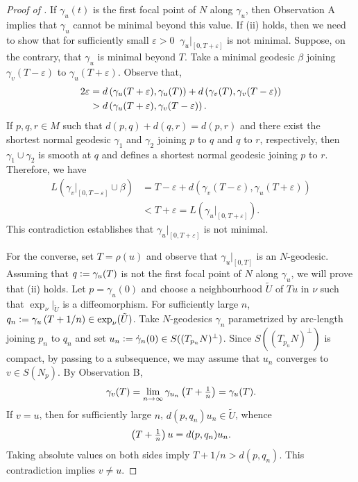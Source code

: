 \begin{proof}[Proof of ]
    If $\gamma_u(t)$ is the first focal point of $N$ along $\gamma_u$, then Observation A implies that $\gamma_u$ cannot be minimal beyond this value. If (ii) holds, then we need to show that for sufficiently small $\varepsilon>0~$ $\gamma_u|_{[0,T+\varepsilon]}$ is not minimal. Suppose, on the contrary, that $\gamma_u$ is minimal beyond $T$. Take a minimal geodesic $\beta$ joining $\gamma_{v}(T-\varepsilon)$ to $\gamma_{u}(T+\varepsilon)$. Observe that,
	\begin{align*}
	    2\varepsilon & = d\left( \gamma_{u}(T+\varepsilon),\gamma_u(T) \right) + d\left( \gamma_v(T),\gamma_v(T-\varepsilon) \right) \\
        & > d\left( \gamma_u(T+\varepsilon),\gamma_v(T-\varepsilon) \right).
	\end{align*}
    If $p,q,r\in M$ such that $d(p,q)+d(q,r) = d(p,r)$ and there exist the shortest normal geodesic $\gamma_{1}$ and $\gamma_{2}$ joining $p$ to $q$ and $q$ to $r$, respectively, then $\gamma_{1}\cup \gamma_2$ is smooth at $q$ and defines a shortest normal geodesic joining $p$ to $r$. Therefore, we have
    \begin{align*}
		L(\gamma_v|_{[0,T-\varepsilon]}\cup \beta) & = T-\varepsilon + d(\gamma_v(T-\varepsilon),\gamma_u(T+\varepsilon)) \\
        & < T + \varepsilon = L(\gamma_u|_{[0,T+\varepsilon]}).
	\end{align*}
    This contradiction establishes that $\gamma_u|_{[0,T+\varepsilon]}$ is not minimal.
    
    \vspace{0.1cm}
    \hf For the converse, set $T=\rho(u)$ and observe that $\gamma_u|_{[0,T]}$ is an $N$-geodesic. Assuming that $q\vcentcolon= \gamma_{u}(T)$ is not the first focal point of $N$ along $\gamma_{u}$, we will prove that (ii) holds. Let $p=\gamma_u(0)$ and choose a neighbourhood $\tilde{U}$ of $Tu$ in $\nu$ such that $\exp_{\nu}|_{\tilde{U}}$ is a diffeomorphism. For sufficiently large $n$, $q_{n}\vcentcolon= \gamma_{u}\left( T+1/n \right)\in \exp_{\nu}(\tilde{U})$. Take $N$-geodesics $\gamma_{n}$ parametrized by arc-length joining $p_n$ to $q_{n}$ and set $u_{n}\vcentcolon= \dot{\gamma}_{n}(0)\in S((T_{p_n}N)^\perp)$. Since $S((T_{p_n}N)^\perp)$ is compact, by passing to a subsequence, we may assume that $u_{n}$ converges to $v\in S(N_{p})$. By Observation B, 
	\begin{displaymath}
	    \gamma_v(T) = \lim_{n\to \infty} \gamma_{u_n}\left( T+\textstyle{\frac{1}{n}} \right) = \gamma_u(T).
	\end{displaymath}
    If $v = u$, then for sufficiently large $n$, $d(p,q_n)u_{n} \in \tilde{U}$, whence 
	\begin{displaymath}
	    \left( T+\textstyle{\frac{1}{n}} \right)u = d(p,q_n)u_n.
	\end{displaymath}
    Taking absolute values on both sides imply $T+1/n>d(p,q_n)$. This contradiction implies $v\neq u$.
\end{proof}
